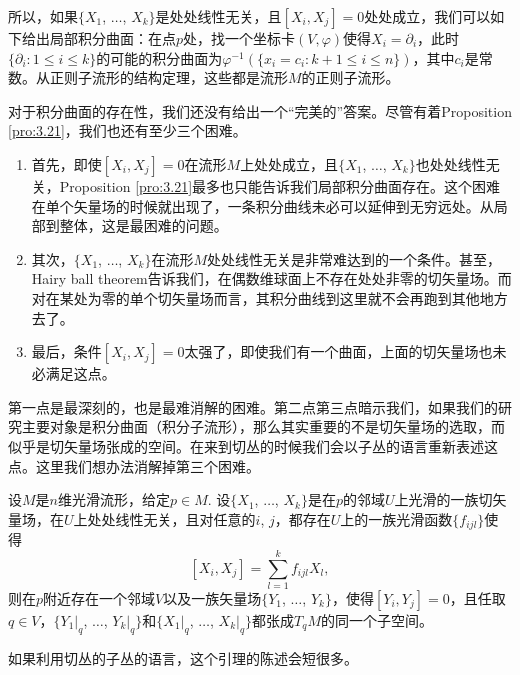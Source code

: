 所以，如果$\{X_1$, $\dots$, $X_k\}$是处处线性无关，且$[X_i,X_j]=0$处处成立，我们可以如下给出局部积分曲面：在点$p$处，找一个坐标卡$(V,\varphi)$使得$X_i=\partial_i$，此时$\{\partial_i:1\leq i \leq k\}$的可能的积分曲面为$\varphi^{-1}\left(\{x_i=c_i:k+1\leq i \leq n\}\right)$，其中$c_i$是常数。从正则子流形的结构定理，这些都是流形$M$的正则子流形。

\begin{para}
对于积分曲面的存在性，我们还没有给出一个“完美的”答案。尽管有着Proposition \ref{pro:3.21}，我们也还有至少三个困难。

\begin{enumerate}[(1)]
\item 首先，即使$[X_i,X_j]=0$在流形$M$上处处成立，且$\{X_1$, $\dots$, $X_k\}$也处处线性无关，Proposition \ref{pro:3.21}最多也只能告诉我们局部积分曲面存在。这个困难在单个矢量场的时候就出现了，一条积分曲线未必可以延伸到无穷远处。从局部到整体，这是最困难的问题。
\item 其次，$\{X_1$, $\dots$, $X_k\}$在流形$M$处处线性无关是非常难达到的一个条件。甚至，Hairy ball theorem告诉我们，在偶数维球面上不存在处处非零的切矢量场。而对在某处为零的单个切矢量场而言，其积分曲线到这里就不会再跑到其他地方去了。
\item 最后，条件$[X_i,X_j]=0$太强了，即使我们有一个曲面，上面的切矢量场也未必满足这点。
\end{enumerate}

第一点是最深刻的，也是最难消解的困难。第二点第三点暗示我们，如果我们的研究主要对象是积分曲面（积分子流形），那么其实重要的不是切矢量场的选取，而似乎是切矢量场张成的空间。在来到切丛的时候我们会以子丛的语言重新表述这点。这里我们想办法消解掉第三个困难。
\end{para}

\begin{lem}\label{lem:3.23}
设$M$是$n$维光滑流形，给定$p\in M$. 设$\{X_1$, $\dots$, $X_k\}$是在$p$的邻域$U$上光滑的一族切矢量场，在$U$上处处线性无关，且对任意的$i$, $j$，都存在$U$上的一族光滑函数$\{f_{ijl}\}$使得
\[
	[X_i,X_j]=\sum_{l=1}^kf_{ijl}X_l,
\]
则在$p$附近存在一个邻域$V$以及一族矢量场$\{Y_1$, $\dots$, $Y_k\}$，使得$[Y_i,Y_j]=0$，且任取$q\in V$，$\{Y_1|_q$, $\dots$, $Y_k|_q\}$和$\{X_1|_q$, $\dots$, $X_k|_q\}$都张成$T_qM$的同一个子空间。
\end{lem}

如果利用切丛的子丛的语言，这个引理的陈述会短很多。

